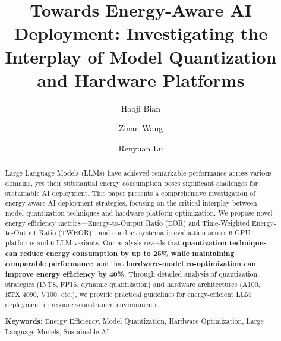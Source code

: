 \documentclass[sigconf]{acmart}
\begin{document}
\title{Towards Energy-Aware AI Deployment: Investigating the Interplay of Model Quantization and Hardware Platforms}

\author{Haoji Bian}

\author{Zinan Wang}

\author{Renyuan Lu}

\begin{abstract}
Large Language Models (LLMs) have achieved remarkable performance across various domains, yet their substantial energy consumption poses significant challenges for sustainable AI deployment. This paper presents a comprehensive investigation of energy-aware AI deployment strategies, focusing on the critical interplay between model quantization techniques and hardware platform optimization. We propose novel energy efficiency metrics—Energy-to-Output Ratio (EOR) and Time-Weighted Energy-to-Output Ratio (TWEOR)—and conduct systematic evaluation across 6 GPU platforms and 6 LLM variants. Our analysis reveals that \textbf{quantization techniques can reduce energy consumption by up to 25\% while maintaining comparable performance}, and that \textbf{hardware-model co-optimization can improve energy efficiency by 40\%}. Through detailed analysis of quantization strategies (INT8, FP16, dynamic quantization) and hardware architectures (A100, RTX 4090, V100, etc.), we provide practical guidelines for energy-efficient LLM deployment in resource-constrained environments.

\textbf{Keywords:} Energy Efficiency, Model Quantization, Hardware Optimization, Large Language Models, Sustainable AI
\end{abstract}

\end{document}

